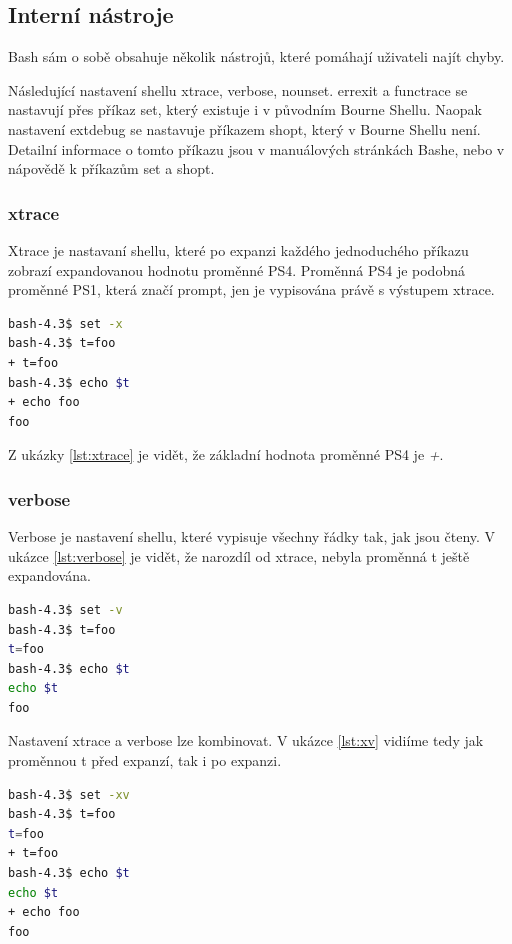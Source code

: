 \documentclass[thesis=M,czech]{FITthesis}[2012/06/26]
\begin{document}
%
\subsection{Interní nástroje}

Bash sám o sobě obsahuje několik nástrojů, které pomáhají uživateli najít chyby.

Následující nastavení shellu xtrace, verbose, nounset. errexit a functrace se nastavují přes příkaz set, který existuje i v původním Bourne Shellu. Naopak nastavení extdebug se nastavuje příkazem shopt, který v Bourne Shellu není. Detailní informace o tomto příkazu jsou v manuálových stránkách Bashe, nebo v nápovědě k příkazům set a shopt.

\subsubsection{xtrace}

Xtrace je nastavaní shellu, které po expanzi každého jednoduchého příkazu zobrazí expandovanou hodnotu proměnné PS4. Proměnná PS4 je podobná proměnné PS1, která značí prompt, jen je vypisována právě s výstupem xtrace.

\begin{lstlisting}[language=bash, caption={Nastavení xtrace}, label={lst:xtrace}]
bash-4.3$ set -x
bash-4.3$ t=foo
+ t=foo
bash-4.3$ echo $t
+ echo foo
foo
\end{lstlisting}

Z ukázky \ref{lst:xtrace} je vidět, že základní hodnota proměnné PS4 je \textit{+}.

\subsubsection{verbose}

Verbose je nastavení shellu, které vypisuje všechny řádky tak, jak jsou čteny. V ukázce \ref{lst:verbose} je vidět, že narozdíl od xtrace, nebyla proměnná t ještě expandována.

\begin{lstlisting}[language=bash, caption={Nastavní verbose}, label={lst:verbose}]
bash-4.3$ set -v
bash-4.3$ t=foo
t=foo
bash-4.3$ echo $t
echo $t
foo
\end{lstlisting}

Nastavení xtrace a verbose lze kombinovat. V ukázce \ref{lst:xv} vidiíme tedy jak proměnnou t před expanzí, tak i po expanzi.

\begin{lstlisting}[language=bash, caption={Výstup z knihovny Bashlex}, label={lst:xv}]
bash-4.3$ set -xv
bash-4.3$ t=foo
t=foo
+ t=foo
bash-4.3$ echo $t
echo $t
+ echo foo
foo
\end{lstlisting}
\end{document}
